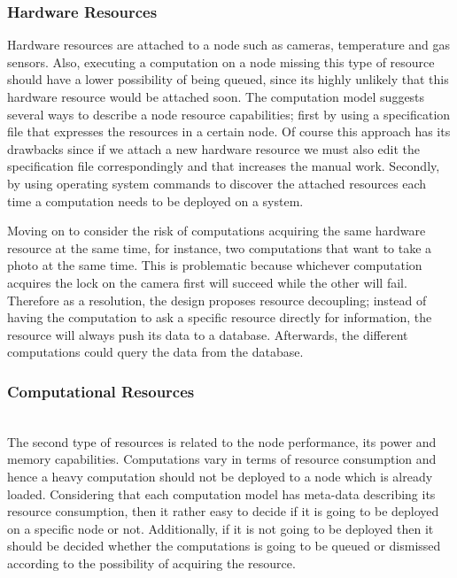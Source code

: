 \subsubsection{Hardware Resources}

  Hardware resources  are attached to a node such as cameras, temperature and gas sensors.  Also, executing a computation on a node missing this type of resource should have a lower possibility of being queued, since its highly unlikely that this hardware resource would be attached soon. The computation model suggests several ways to describe a node resource capabilities; first by using a specification file that expresses the resources in a certain node. Of course this approach has its drawbacks since if we attach a new hardware resource we must also edit the specification file correspondingly and that increases the manual work. Secondly, by using operating system commands to discover the attached resources each time a computation needs to be deployed on a system. 
  
  Moving on to consider the risk of computations acquiring the same hardware resource at the same time, for instance, two computations that want to take a photo at the same time. This is problematic because whichever computation acquires the lock on the camera first will succeed while the other will fail. Therefore as a resolution, the design proposes resource decoupling; instead of having the computation to ask a specific resource directly for information, the resource will always push its data to a database. Afterwards, the different computations could query the data from the database.
  

\subsubsection{Computational Resources }\mbox{}\\

The second type of resources is related to the node performance, its power and memory capabilities. Computations vary in terms of resource consumption and hence a heavy computation should not be deployed to a node which is already loaded. Considering that each computation model has meta-data describing its resource consumption, then it rather easy to decide if it is going to be deployed on a specific node or not. Additionally, if it is not going to be deployed then it should be decided whether the computations is going to be queued or dismissed according to the possibility of acquiring the resource.




